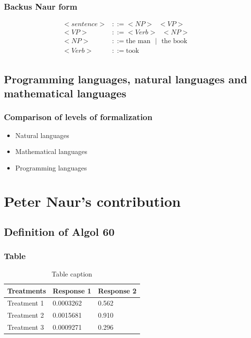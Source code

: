 \documentclass{beamer}
\begin{document}
\begin{frame}
\frametitle{Backus Naur form}
\begin{equation} \label{eq2}
	\begin{split}
	<sentence> &::=<NP>\text{ }<VP> \\
	<VP> &::=<Verb>\text{ }<NP> \\
	<NP> &::=\text{the man}\text{ }|\text{ }\text{the book} \\
	<Verb> &::=\text{took} \\
\end{split}
\end{equation}
\end{frame}


\subsection{Programming languages, natural languages and mathematical languages}

\begin{frame}
\frametitle{Comparison of levels of formalization}
\begin{itemize}
	\item Natural languages
	\item Mathematical languages
	\item Programming languages
\end{itemize}
\end{frame}

\section{Peter Naur's contribution}

\subsection{Definition of Algol 60}

\begin{frame}
\frametitle{Table}
\begin{table}
\begin{tabular}{l l l}
\toprule
\textbf{Treatments} & \textbf{Response 1} & \textbf{Response 2}\\
\midrule
Treatment 1 & 0.0003262 & 0.562 \\
Treatment 2 & 0.0015681 & 0.910 \\
Treatment 3 & 0.0009271 & 0.296 \\
\bottomrule
\end{tabular}
\caption{Table caption}
\end{table}
\end{frame}
\end{document}
